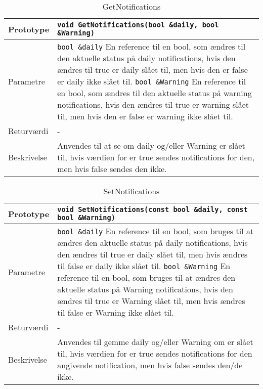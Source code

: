 \begin{table}[ht]
\begin{tabularx}{\textwidth}{| L{2.5 cm} | Z |} \hline
Prototype & \texttt{void GetNotifications(bool \&daily, bool \&Warning)} \\\hline
Parametre & \texttt{bool \&daily} \newline En reference til en bool, som ændres til den aktuelle status på daily notifications, hvis den ændres til true er daily slået til, men hvis den er false er daily ikke slået til.
\newline
\texttt{bool \&Warning} \newline En reference til en bool, som ændres til den aktuelle status på warning notifications, hvis den ændres til true er warning slået til, men hvis den er false er warning ikke slået til.
 \\\hline
Returværdi & - \\\hline
Beskrivelse & Anvendes til at se om daily og/eller Warning er slået til, hvis værdien for er true sendes notifications for den, men hvis false sendes den ikke.\\\hline
\end{tabularx}
\caption{GetNotifications}
\label{table:Indstillinger_GetNotifications}
\end{table}

\clearpage

\begin{table}[ht]
\begin{tabularx}{\textwidth}{| L{2.5 cm} | Z |} \hline
Prototype & \texttt{void SetNotifications(const bool \&daily, const bool \&Warning)} \\\hline
Parametre & \texttt{bool \&daily} \newline En reference til en bool, som bruges til at ændres den aktuelle status på daily notifications, hvis den ændres til true er daily slået til, men hvis ændres til false er daily ikke slået til.
\newline
\texttt{bool \&Warning} \newline En reference til en bool, som bruges til at ændres den aktuelle status på Warning notifications, hvis den ændres til true er Warning slået til, men hvis ændres til false er Warning ikke slået til.
 \\\hline
Returværdi & - \\\hline
Beskrivelse & Anvendes til gemme daily og/eller Warning om er slået til, hvis værdien for er true sendes notifications for den angivende notification, men hvis false sendes den/de ikke.\\\hline
\end{tabularx}
\caption{SetNotifications}
\label{table:Indstillinger_SetNotifications}
\end{table}

